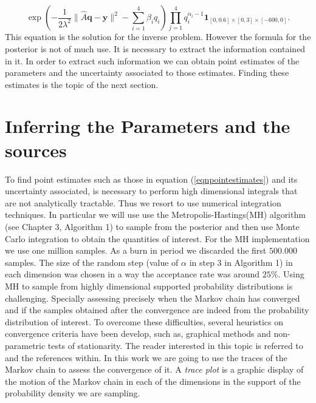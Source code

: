 \documentclass[12pt]{book}
\newcommand{\q}{\textbf{q}}
\newcommand{\y}{\textbf{y}}
\begin{document}
\begin{equation}\label{eqnPosteriorFinal}
\exp\left(-\frac{1}{2\lambda^{2}}\|\widehat{A}\q-\y\|^{2}-\sum_{i=1}^{4}\beta_{i}q_{i}\right)\prod_{j=1}^{4}q_{i}^{\alpha_{i}-1}\textbf{1}_{[0,0.6]\times[0,3]\times[-600,0]}.
\end{equation}
This equation is the solution for the inverse problem. However the formula for the posterior is not of much use. It is
necessary to extract the information contained in it. In order to extract such information we can
obtain point estimates of the parameters and the uncertainty associated to those estimates. 
Finding these estimates is the topic of the next section.



\section{Inferring the Parameters and the sources}

To find  point estimates such as those  in equation (\ref{eqnpointestimates}) and its uncertainty associated,  is necessary to perform  high
dimensional integrals that are not analytically tractable. Thus we resort to use numerical integration techniques. In 
particular   we will use use 
the Metropolis-Hastings(MH) algorithm (see Chapter 3, Algorithm 1) to sample from the posterior and then
use Monte Carlo integration to obtain the quantities of interest. For the MH implementation we
use one million samples. As a burn in period we discarded the first $500.000$ samples. The size
of the random step (value of $\alpha$ in step 3 in Algorithm 1) in each dimension was chosen 
in a way the acceptance rate was around $25\%$.
Using MH to sample
from highly dimensional supported probability distributions is challenging. Specially assessing precisely
when the Markov chain has converged and if the samples obtained after the convergence are indeed from
the probability distribution of interest. To overcome these difficulties, several heuristics on convergence
criteria have been develop, such as, graphical methods and non-parametric tests of stationarity. The reader
interested in this topic is referred to \cite{casella2008monte} and the references within. 
In this work we are going to use the traces of the Markov chain to assess the convergence of it. 
A \textit{trace plot} is a graphic display of the motion of the Markov chain in each
of the dimensions in the support of the probability density we are sampling. 
\end{document}

